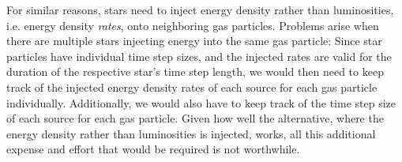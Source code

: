 For similar reasons, stars need to inject energy density rather than luminosities, i.e. energy
density \emph{rates}, onto neighboring gas particles. Problems arise when there are multiple stars
injecting energy into the same gas particle: Since star particles have individual time step sizes,
and the injected rates are valid for the duration of the respective star's time step length, we
would then need to keep track of the injected energy density rates of each source for each gas
particle individually. Additionally, we would also have to keep track of the time step size of each
source for each gas particle. Given how well the alternative, where the energy density rather than
luminosities is injected, works, all this additional expense and effort that would be required is
not worthwhile.





%
%
%
%
%
%
%







